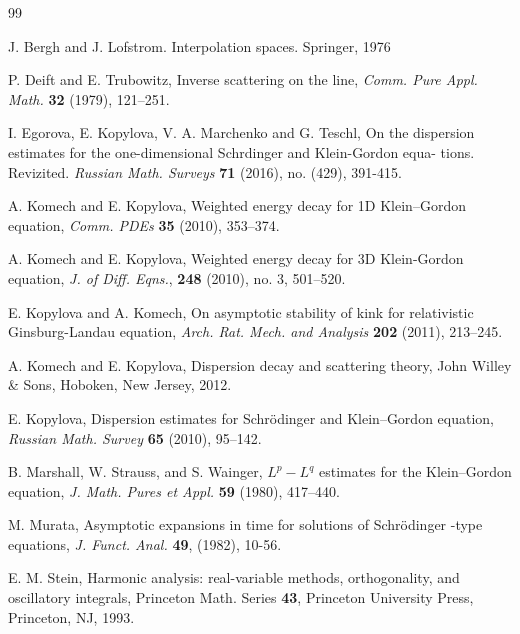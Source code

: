 \documentclass[reqno]{amsart}
\numberwithin{equation}{section}
\begin{document}
\begin{thebibliography}{99}

J. Bergh and J. Lofstrom. 
Interpolation spaces. Springer, 1976

P. Deift and E. Trubowitz,
Inverse scattering on the line,
{\em Comm. Pure Appl. Math.} {\bf 32} (1979), 121--251.

I. Egorova, E. Kopylova, V. A. Marchenko and G. Teschl,
On the dispersion estimates for the one-dimensional Schrdinger and Klein-Gordon equa- tions. Revizited. 
{\em Russian Math. Surveys} {\bf 71} (2016), no. (429), 391-415. 

A. Komech and E. Kopylova,
Weighted energy decay for 1D  Klein--Gordon equation,
{\em Comm. PDEs} {\bf 35} (2010),  353--374.

A. Komech and E. Kopylova,  
Weighted energy decay for 3D Klein-Gordon equation, 
{\em J. of Diff. Eqns.},  {\bf 248} (2010), no. 3, 501--520.

E. Kopylova and A. Komech,
On asymptotic stability of kink for relativistic Ginsburg-Landau equation,
{\em Arch. Rat. Mech. and Analysis} {\bf 202} (2011), 213--245.


A. Komech and E. Kopylova, 
Dispersion decay and scattering theory, 
John Willey \& Sons, Hoboken, New Jersey, 2012.

E. Kopylova,
Dispersion estimates for Schr\"odinger and Klein--Gordon equation,
{\em Russian Math. Survey} {\bf 65} (2010), 95--142.

B. Marshall, W. Strauss, and S. Wainger,
$L^p-L^q$ estimates for the Klein--Gordon equation,
{\em J. Math. Pures et Appl.} {\bf 59} (1980), 417--440.

M. Murata, 
Asymptotic expansions in time for solutions of  Schr\"odinger -type equations, 
{\em J. Funct. Anal.} {\bf 49},  (1982), 10-56.

E. M. Stein, 
Harmonic analysis: real-variable methods, orthogonality, and oscillatory integrals, 
Princeton Math. Series {\bf 43}, Princeton University Press, Princeton, NJ, 1993.

\end{thebibliography}
\end{document}
